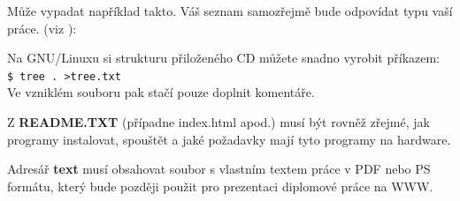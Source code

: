 \documentclass[11pt,twoside,a4paper]{book}
\begin{document}
Může vypadat například takto. Váš seznam samozřejmě bude odpovídat typu vaší práce. (viz \cite{infodp}):


Na GNU/Linuxu si strukturu přiloženého CD můžete snadno vyrobit příkazem:\\ 
\verb|$ tree . >tree.txt|\\
Ve vzniklém souboru pak stačí pouze doplnit komentáře.

Z \textbf{README.TXT} (případne index.html apod.)  musí být rovněž zřejmé, jak programy instalovat, spouštět a
jaké požadavky mají tyto programy na hardware.

Adresář \textbf{text}  musí obsahovat soubor s vlastním textem práce v PDF nebo PS formátu, který bude později
použit pro prezentaci diplomové práce na WWW.
\end{document}
